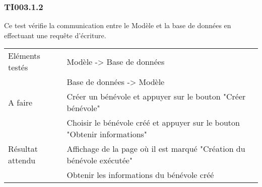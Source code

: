   	\subsubsection{TI003.1.2}
  		Ce test vérifie la communication entre le Modèle et la base de données en effectuant une requête d'écriture.
  		\begin{center}
    	 		\begin{tabular}[h]{|p{}|p{}|}
			\hline
				Eléments testés & Modèle -> Base de données  \\
							    &  Base de données -> Modèle \\\hline
    				A faire & Créer un bénévole et appuyer sur le bouton "Créer bénévole" \\
    						& Choisir le bénévole créé et appuyer sur le bouton "Obtenir informations" \\\hline
    				Résultat attendu & Affichage de la page où il est marqué "Création du bénévole exécutée" \\
    								 & Obtenir les informations du bénévole créé \\\hline
     		\end{tabular}
  		\end{center}	